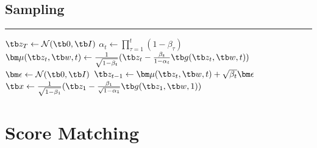 \documentclass{article}
\begin{document}
    \subsection{Sampling}
        \begin{algorithm}[H]
            \DontPrintSemicolon

            \caption{Denoising diffusion probabilistic model (DDPM) sampling algorithm}


            \BlankLine
            \hrule
            $\tb z_T \leftarrow \mathcal{N}(\tb 0, \tb I)$\;
            {
                $\alpha_t \leftarrow \prod_{\tau=1}^{t}(1-\beta_\tau)$\;
                $\bm\mu(\tb z_t, \tb w, t) \leftarrow \frac{1}{\sqrt{1-\beta_t}}(\tb z_t - \frac{\beta_t}{1-\alpha_t}\tb g(\tb z_t,\tb w,t))$\;
                $\bm\epsilon \leftarrow \mathcal{N}(\tb 0, \tb I)$\;
                $\tb z_{t-1} \leftarrow \bm\mu(\tb z_t,\tb w,t) + \sqrt{\beta_t}\bm\epsilon$\;
            }
            $\tb x \leftarrow \frac{1}{\sqrt{1-\beta_1}}(\tb z_1 - \frac{\beta_1}{\sqrt{1-\alpha_1}}\tb g(\tb z_1,\tb w,1))$\;
        \end{algorithm}
\section{Score Matching}
\end{document}
